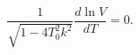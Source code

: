 \begin{equation}\label{disp}
\frac{1}{\sqrt{1-4T^{2}_{0}k^{2}}}\frac{d\ln V}{dT}=0.
\end{equation}

